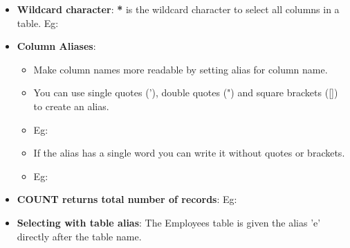\begin{flushleft}
	\begin{itemize}
		\item \textbf{Wildcard character}: \textbf{*} is the wildcard character to select all columns in a table.
		\newline
		Eg:
		\item \textbf{Column Aliases}: 
		\begin{itemize}
			\item Make column names more readable by setting alias for column name.
			\item You can use single quotes ('), double quotes (") and square brackets ([]) to create an alias.
			\newpage
			\item Eg:
			\item If the alias has a single word you can write it without quotes or brackets.
			\item Eg:
		\end{itemize}
		\item \textbf{COUNT returns total number of records}:
			\bigskip
			Eg:
			\newpage
		

		\item \textbf{Selecting with table alias}:
		\bigskip
		The Employees table is given the alias 'e' directly after the table name.
		

\end{itemize}
\end{flushleft}
